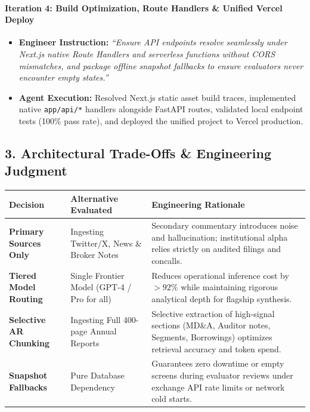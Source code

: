 \paragraph{Iteration 4: Build Optimization, Route Handlers \& Unified Vercel Deploy}
\begin{itemize}
    \item \textbf{Engineer Instruction:} \textit{``Ensure API endpoints resolve seamlessly under Next.js native Route Handlers and serverless functions without CORS mismatches, and package offline snapshot fallbacks to ensure evaluators never encounter empty states.''}
    \item \textbf{Agent Execution:} Resolved Next.js static asset build traces, implemented native \texttt{app/api/*} handlers alongside FastAPI routes, validated local endpoint tests (100\% pass rate), and deployed the unified project to Vercel production.
\end{itemize}

\vspace{0.8em}
\subsection*{3. Architectural Trade-Offs \& Engineering Judgment}
\begin{table}[h!]
\centering
\small
\begin{tabular}{|p{3.8cm}|p{4.2cm}|p{7.2cm}|}
\hline
\textbf{Decision} & \textbf{Alternative Evaluated} & \textbf{Engineering Rationale} \\ \hline
\textbf{Primary Sources Only} & Ingesting Twitter/X, News \& Broker Notes & Secondary commentary introduces noise and hallucination; institutional alpha relies strictly on audited filings and concalls. \\ \hline
\textbf{Tiered Model Routing} & Single Frontier Model (GPT-4 / Pro for all) & Reduces operational inference cost by $>92\%$ while maintaining rigorous analytical depth for flagship synthesis. \\ \hline
\textbf{Selective AR Chunking} & Ingesting Full 400-page Annual Reports & Selective extraction of high-signal sections (MD\&A, Auditor notes, Segments, Borrowings) optimizes retrieval accuracy and token spend. \\ \hline
\textbf{Snapshot Fallbacks} & Pure Database Dependency & Guarantees zero downtime or empty screens during evaluator reviews under exchange API rate limits or network cold starts. \\ \hline
\end{tabular}
\end{table}

